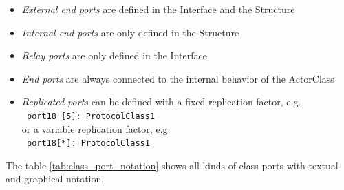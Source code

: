 \begin{itemize}
\item \textit{External end ports} are defined in the Interface and the Structure
\item \textit{Internal end ports} are only defined in the Structure
\item \textit{Relay ports} are only defined in the Interface
\item \textit{End ports} are always connected to the internal behavior of the ActorClass
\item \textit{Replicated ports} can be defined with a fixed replication factor, e.g.\\
\texttt{ port18 [5]: ProtocolClass1}\\
or a variable replication factor, e.g.\\
\texttt{ port18[*]: ProtocolClass1}
\end{itemize}

The table \ref{tab:class_port_notation} shows all kinds of class ports with textual and graphical notation.


